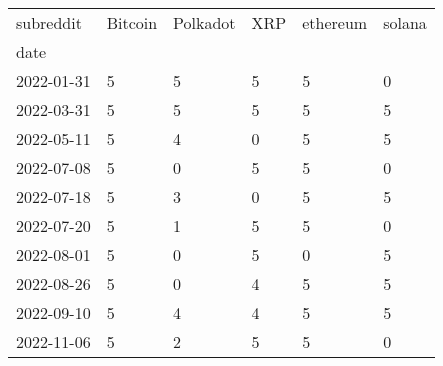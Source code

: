 \begin{tabular}{llllll}
\toprule
subreddit & Bitcoin & Polkadot & XRP & ethereum & solana \\
date       &         &          &     &          &        \\
\midrule
2022-01-31 &       5 &        5 &   5 &        5 &      0 \\
2022-03-31 &       5 &        5 &   5 &        5 &      5 \\
2022-05-11 &       5 &        4 &   0 &        5 &      5 \\
2022-07-08 &       5 &        0 &   5 &        5 &      0 \\
2022-07-18 &       5 &        3 &   0 &        5 &      5 \\
2022-07-20 &       5 &        1 &   5 &        5 &      0 \\
2022-08-01 &       5 &        0 &   5 &        0 &      5 \\
2022-08-26 &       5 &        0 &   4 &        5 &      5 \\
2022-09-10 &       5 &        4 &   4 &        5 &      5 \\
2022-11-06 &       5 &        2 &   5 &        5 &      0 \\
\bottomrule
\end{tabular}
